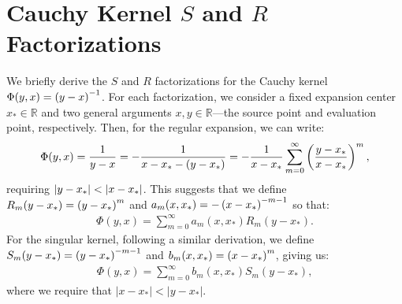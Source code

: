 \section{Cauchy Kernel $S$ and $R$ Factorizations}

We briefly derive the $S$
and $R$
factorizations for the Cauchy kernel $\Phi(y, x) = \left(y - x\right)^{-1}$.
For each factorization, we consider a fixed expansion center
$x_* \in \mathbb{R}$
and two general arguments $x, y \in \mathbb{R}$\----the source point and evaluation point, respectively.  Then, for
the regular expansion, we can write:
\begin{align*}
  \Phi(y, x) = {1 \over y - x} = -{1 \over x - x_* - (y - x_*)} = -{1 \over x - x_*} \sum_{m=0}^\infty \left(y - x_* \over x - x_*\right)^m,
\end{align*}
requiring $\left|y - x_*\right| < \left|x - x_*\right|$.
This suggests that we define $R_m(y - x_*) = \left(y - x_*\right)^m$ and $a_m(x, x_*) = -\left(x - x_*\right)^{-m-1}$ so that:
\begin{align*}
  \Phi(y, x) = \sum_{m=0}^\infty a_m(x, x_*) R_m(y - x_*).
\end{align*}
For the singular kernel, following a similar derivation, we define $S_m(y - x_*) = \left(y - x_*\right)^{-m-1}$ and $b_m(x, x_*) = \left(x - x_*\right)^m$, giving us:
\begin{align*}
  \Phi(y, x) = \sum_{m=0}^\infty b_m(x, x_*) S_m(y - x_*),
\end{align*}
where we require that $|x - x_*| < |y - x_*|$. \\
